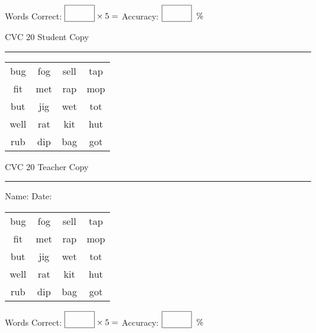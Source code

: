 \documentclass{memoir}
\begin{document}
\small

Words Correct: $\fbox{\phantom{\huge 100}} \times 5 = $ Accuracy: $\fbox{\phantom{\huge 100}}\;\; \%$ 

\vfill

\newpage



\footnotesize \noindent
CVC 20 \hfill Student Copy
\smallskip
\hrule

\Large

\setlength{\tabcolsep}{14pt}
\def\arraystretch{2}

{\selectfont


\begin{vplace}[0.5]
\begin{center}
\begin{tabular}{cccc}
bug & fog & sell & tap \\
fit & met & rap & mop \\
but & jig & wet & tot \\
well & rat & kit & hut \\
rub & dip & bag & got \\
\end{tabular}
\end{center}
\end{vplace}

}

\newpage

\footnotesize \noindent
CVC 20 \hfill Teacher Copy
\smallskip
\hrule

\small

\vfill

\noindent
Name: \underline{\hspace{1.75in}} \hfill Date: \underline{\hspace{1in}}

\Large

{\selectfont


\begin{vplace}[0.5]
\begin{center}
\begin{tabular}{cccc}
bug & fog & sell & tap \\
fit & met & rap & mop \\
but & jig & wet & tot \\
well & rat & kit & hut \\
rub & dip & bag & got \\
\end{tabular}
\end{center}
\end{vplace}



}

\small

Words Correct: $\fbox{\phantom{\huge 100}} \times 5 = $ Accuracy: $\fbox{\phantom{\huge 100}}\;\; \%$ 

\vfill

\end{document}

